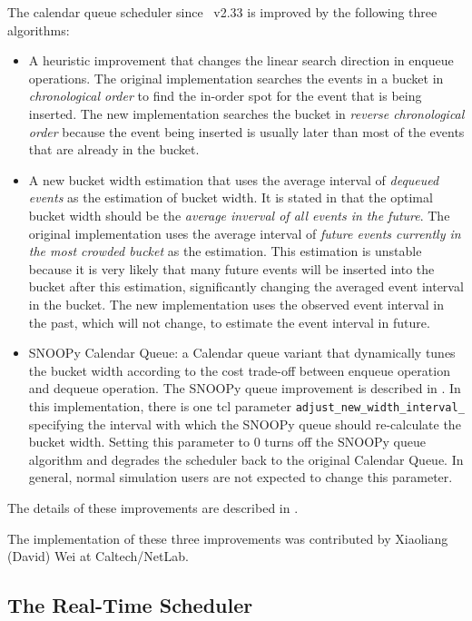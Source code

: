 The calendar queue scheduler since \ns~v2.33 is improved by the following
three algorithms:
\begin{itemize}
	\item A heuristic improvement that changes the linear search direction
in enqueue operations. The original implementation searches the events in
a bucket in \emph{chronological order} to find the in-order spot for the event
that is being inserted.
The new implementation searches the bucket in \emph{reverse chronological order}
because the event being inserted is usually later than most of the events that are
already in the bucket.
	\item A new bucket width estimation that uses the average interval of
\emph{dequeued events} as the estimation of bucket width. It is stated in
\cite{Brow88:Calendar} that the optimal bucket width should be the \emph{average inverval of all events in the future}.
The original implementation uses the average interval of \emph{future events currently in the most crowded bucket}
as the estimation. This estimation is unstable because it is very likely
that many future events will be inserted into the bucket after this estimation, significantly changing the
averaged event interval in the bucket. The new implementation uses the observed event interval 
in the past, which will not change, to estimate the event interval in future.
	\item SNOOPy Calendar Queue: a Calendar queue variant that dynamically
tunes the bucket width according to the cost trade-off between enqueue
operation and dequeue operation.
The SNOOPy queue improvement is described in \cite{Tan00SNOOPyQueue}.
In this implementation, there is one tcl parameter {\tt adjust\_new\_width\_interval\_ }
specifying the interval with which the SNOOPy queue should re-calculate the bucket width.
Setting this parameter to 0 turns off the SNOOPy queue algorithm and degrades the scheduler
back to the original Calendar Queue. In general, normal simulation users are
not expected to change this parameter.
\end{itemize}
The details of these improvements are described in \cite{WeiCao06NSLinuxTCP}.

The implementation of these three improvements was contributed by Xiaoliang (David) Wei at Caltech/NetLab.

\subsection{The Real-Time Scheduler}
\label{sec:rtsched}

